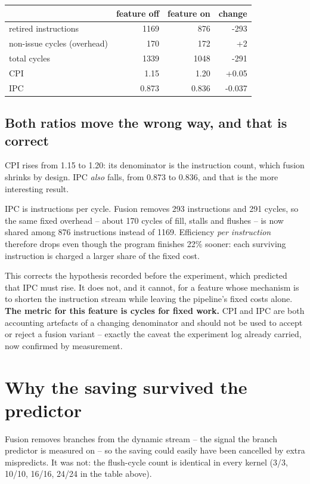\documentclass[11pt]{article}
\begin{document}
\begin{table}[h]
\centering
\begin{tabular}{lrrr}
\toprule
 & feature off & feature on & change \\
\midrule
retired instructions & 1169 & 876 & -293 \\
non-issue cycles (overhead) & 170 & 172 & +2 \\
total cycles & 1339 & 1048 & -291 \\
\midrule
CPI & 1.15 & 1.20 & +0.05 \\
IPC & 0.873 & 0.836 & -0.037 \\
\bottomrule
\end{tabular}
\end{table}

\subsection{Both ratios move the wrong way, and that is correct}

CPI rises from 1.15 to 1.20: its denominator is the
instruction count, which fusion shrinks by design. IPC \emph{also} falls, from
0.873 to 0.836, and that is the more interesting result.

IPC is instructions per cycle. Fusion removes 293 instructions and 291 cycles, so the same
fixed overhead -- about 170 cycles of fill, stalls and flushes -- is now shared among 876
instructions instead of 1169. Efficiency \emph{per instruction} therefore drops even though
the program finishes 22\% sooner: each surviving instruction is charged a larger share of the
fixed cost.

This corrects the hypothesis recorded before the experiment, which predicted that IPC must
rise. It does not, and it cannot, for a feature whose mechanism is to shorten the
instruction stream while leaving the pipeline's fixed costs alone. \textbf{The metric for
this feature is cycles for fixed work.} CPI and IPC are both accounting artefacts of a
changing denominator and should not be used to accept or reject a fusion variant -- exactly
the caveat the experiment log already carried, now confirmed by measurement.

\section{Why the saving survived the predictor}

Fusion removes branches from the dynamic stream -- the signal the branch predictor is
measured on -- so the saving could easily have been cancelled by extra mispredicts. It was
not: the flush-cycle count is identical in every kernel (3/3, 10/10, 16/16, 24/24 in the
table above).
\end{document}
